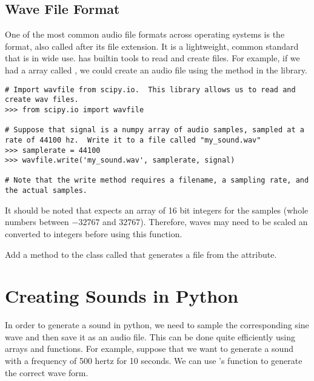 \subsection*{Wave File Format} 

One of the most common audio file formats across operating systems is the  format, also called  after its file extension.
It is a lightweight, common standard that is in wide use.
 has builtin tools to read and create  files.
For example, if we had a  array called , we could create an audio file using the  method in the  library.

\begin{lstlisting}
# Import wavfile from scipy.io.  This library allows us to read and create wav files.
>>> from scipy.io import wavfile

# Suppose that signal is a numpy array of audio samples, sampled at a rate of 44100 hz.  Write it to a file called "my_sound.wav"
>>> samplerate = 44100
>>> wavfile.write('my_sound.wav', samplerate, signal)

# Note that the write method requires a filename, a sampling rate, and the actual samples.
\end{lstlisting}

It should be noted that  expects an array of 16 bit integers for the samples (whole numbers between $-32767$ and $32767$).
Therefore, waves may need to be scaled an converted to integers before using this function.

\begin{problem}

Add a method to the  class called  that generates a  file from the  attribute.

\end{problem}

\section*{Creating Sounds in Python}

In order to generate a sound in python, we need to sample the corresponding sine wave and then save it as an audio file.
This can be done quite efficiently using  arrays and functions.
For example, suppose that we want to generate a sound with a frequency of 500 hertz for 10 seconds.
We can use 's  function to generate the correct wave form.

